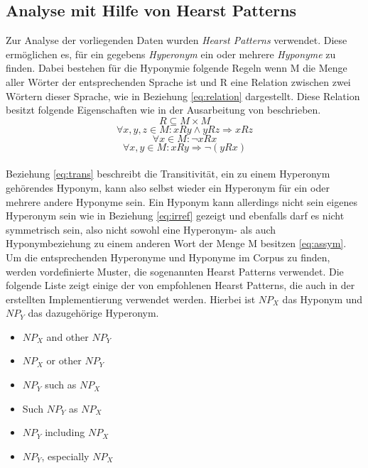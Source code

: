 \subsection{Analyse mit Hilfe von Hearst Patterns}%
%
Zur Analyse der vorliegenden Daten wurden \textit{Hearst Patterns}
verwendet. Diese ermöglichen es, für ein gegebens \textit{Hyperonym}
ein oder mehrere \textit{Hyponyme} zu finden. Dabei bestehen für die
Hyponymie folgende Regeln wenn M die Menge aller Wörter der
entsprechenden Sprache ist und R eine Relation zwischen zwei Wörtern
dieser Sprache, wie in Beziehung \ref{eq:relation} dargestellt. Diese
Relation besitzt folgende Eigenschaften wie in der Ausarbeitung von
 beschrieben.%
~\\%
\begin{equation}
  \label{eq:relation}
  R \subseteq M \times M
\end{equation}
\begin{equation}
  \label{eq:trans}
  \forall x, y, z \in M : xRy \land yRz \Rightarrow xRz
\end{equation}
\begin{equation}
  \label{eq:irref}
  \forall x \in M : \neg xRx
\end{equation}
\begin{equation}
  \label{eq:assym}
  \forall x, y \in M : xRy \Rightarrow \neg (yRx)
\end{equation}%
~\\%
Beziehung \ref{eq:trans} beschreibt die Transitivität, ein zu einem
Hyperonym gehörendes Hyponym, kann also selbst wieder ein Hyperonym
für ein oder mehrere andere Hyponyme sein. Ein Hyponym kann allerdings
nicht sein eigenes Hyperonym sein wie in Beziehung \ref{eq:irref}
gezeigt und ebenfalls darf es nicht symmetrisch sein, also nicht
sowohl eine Hyperonym- als auch Hyponymbeziehung zu einem anderen Wort
der Menge M besitzen \ref{eq:assym}.%
\\%
Um die entsprechenden Hyperonyme und Hyponyme im Corpus zu finden,
werden vordefinierte Muster, die sogenannten Hearst Patterns
verwendet. Die folgende Liste zeigt einige der von
 empfohlenen Hearst Patterns, die auch in der
erstellten Implementierung verwendet werden. Hierbei ist $NP_{X}$ das
Hyponym und $NP_{Y}$ das dazugehörige Hyperonym. \cite{bib:Snow2004}%
%
\begin{itemize}
\item $NP_{X}$ and other $NP_{Y}$
\item $NP_{X}$ or other $NP_{Y}$
\item $NP_{Y}$ such as $NP_{X}$
\item Such $NP_{Y}$ as $NP_{X}$
\item $NP_{Y}$ including $NP_{X}$
\item $NP_{Y}$, especially $NP_{X}$
\end{itemize}%
